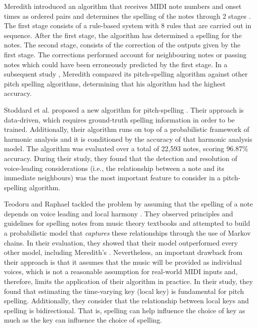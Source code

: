 Meredith introduced an algorithm that receives MIDI note numbers and onset times as ordered pairs and determines the spelling of the notes through 2 stages \cite{meredith_pitch_2003}. The first stage consists of a rule-based system with 8 rules that are carried out in sequence. After the first stage, the algorithm has determined a spelling for the notes. The second stage, consists of the correction of the outputs given by the first stage. The corrections performed account for neighbouring notes or passing notes which could have been erroneously predicted by the first stage. In a subsequent study \cite{meredith_comparing_2005}, Meredith compared its pitch-spelling algorithm against other pitch spelling algorithms, determining that his algorithm had the highest accuracy. 



Stoddard et al. proposed a new algorithm for pitch-spelling \cite{stoddard_well-tempered_2004}. Their approach is data-driven, which requires ground-truth spelling information in order to be trained. Additionally, their algorithm runs on top of a probabilistic framework of harmonic analysis \cite{raphael_harmonic_2003} and it is conditioned by the accuracy of that harmonic analysis model. The algorithm was evaluated over a total of 22,593 notes, scoring 96.87\% accuracy. During their study, they found that the detection and resolution of voice-leading considerations (i.e., the relationship between a note and its immediate neighbours) was the most important feature to consider in a pitch-spelling algorithm.

Teodoru and Raphael tackled the problem by assuming that the spelling of a note depends on voice leading and local harmony \cite{teodoru_pitch_2007}. They observed principles and guidelines for spelling notes from music theory textbooks \cite{aldwell_harmony_2017, rimsky-korsakov_practical_2005} and attempted to build a probabilistic model that \emph{captures} these relationships through the use of Markov chains. In their evaluation, they showed that their model outperformed every other model, including Meredith's \cite{meredith_ps13_2006}. Nevertheless, an important drawback from their approach is that it assumes that the music will be provided as individual voices, which is not a reasonable assumption for real-world MIDI inputs and, therefore, limits the application of their algorithm in practice. In their study, they found that estimating the time-varying key (local key) is fundamental for pitch spelling. Additionally, they consider that the relationship between local keys and spelling is bidirectional. That is, spelling can help influence the choice of key as much as the key can influence the choice of spelling.


